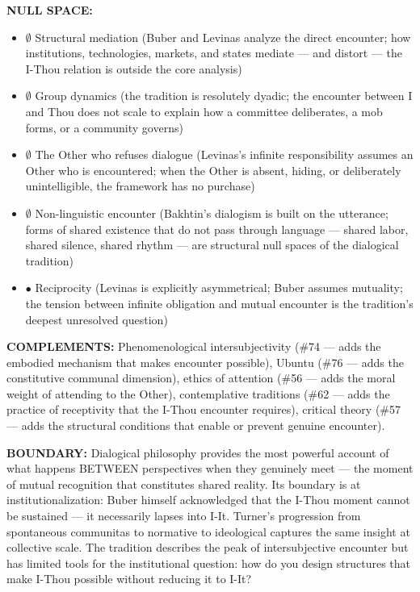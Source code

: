 \textbf{NULL SPACE:}

\begin{itemize}[nosep,leftmargin=*]
  \item $\emptyset$ Structural mediation (Buber and Levinas analyze the direct encounter; how institutions, technologies, markets, and states mediate — and distort — the I-Thou relation is outside the core analysis)
  \item $\emptyset$ Group dynamics (the tradition is resolutely dyadic; the encounter between I and Thou does not scale to explain how a committee deliberates, a mob forms, or a community governs)
  \item $\emptyset$ The Other who refuses dialogue (Levinas's infinite responsibility assumes an Other who is encountered; when the Other is absent, hiding, or deliberately unintelligible, the framework has no purchase)
  \item $\emptyset$ Non-linguistic encounter (Bakhtin's dialogism is built on the utterance; forms of shared existence that do not pass through language — shared labor, shared silence, shared rhythm — are structural null spaces of the dialogical tradition)
  \item $\bullet$ Reciprocity (Levinas is explicitly asymmetrical; Buber assumes mutuality; the tension between infinite obligation and mutual encounter is the tradition's deepest unresolved question)
\end{itemize}


\textbf{COMPLEMENTS:} Phenomenological intersubjectivity (\#74 — adds the embodied mechanism that makes encounter possible), Ubuntu (\#76 — adds the constitutive communal dimension), ethics of attention (\#56 — adds the moral weight of attending to the Other), contemplative traditions (\#62 — adds the practice of receptivity that the I-Thou encounter requires), critical theory (\#57 — adds the structural conditions that enable or prevent genuine encounter).


\textbf{BOUNDARY:} Dialogical philosophy provides the most powerful account of what happens BETWEEN perspectives when they genuinely meet — the moment of mutual recognition that constitutes shared reality. Its boundary is at institutionalization: Buber himself acknowledged that the I-Thou moment cannot be sustained — it necessarily lapses into I-It. Turner's progression from spontaneous communitas to normative to ideological captures the same insight at collective scale. The tradition describes the peak of intersubjective encounter but has limited tools for the institutional question: how do you design structures that make I-Thou possible without reducing it to I-It?


